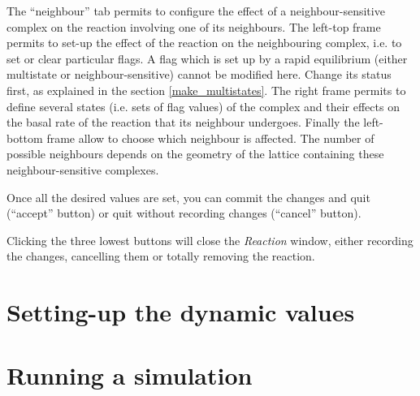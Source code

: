  The ``neighbour'' tab
permits to configure the effect of a neighbour-sensitive complex on the reaction
involving one of its neighbours. The left-top frame permits to set-up the effect
of the reaction on the neighbouring complex, i.e. to set or clear particular
flags. A flag which is set up by a rapid equilibrium (either multistate or
neighbour-sensitive) cannot be modified here. Change its status first, as
explained in the section \ref{make_multistates}.  The right frame permits to
define several states (i.e.  sets of flag values) of the complex and their
effects on the basal rate of the reaction that its neighbour undergoes. Finally
the left-bottom frame allow to choose which neighbour is affected. The number of
possible neighbours depends on the geometry of the lattice containing these
neighbour-sensitive complexes.

Once all the desired values are set, you can commit the changes and quit
(``accept'' button) or quit without recording changes (``cancel'' button).
 
Clicking the three lowest buttons will close the \emph{Reaction} window, either
recording the changes, cancelling them or totally removing the reaction.

\section{Setting-up the dynamic values}

\section{Running a simulation}

